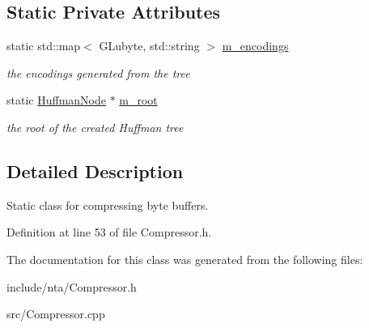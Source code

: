 \subsection*{Static Private Attributes}
\begin{DoxyCompactItemize}
\item 
\mbox{\label{classnta_1_1Compressor_a85e378612ff069d0bc915c87fae74e7d}} 
static std\+::map$<$ G\+Lubyte, std\+::string $>$ \hyperlink{classnta_1_1Compressor_a85e378612ff069d0bc915c87fae74e7d}{m\+\_\+encodings}
\begin{DoxyCompactList}\small\item\em the encodings generated from the tree \end{DoxyCompactList}\item 
\mbox{\label{classnta_1_1Compressor_a9cec9a631892c8cd4b9c2358c7ac41f4}} 
static \hyperlink{classnta_1_1HuffmanNode}{Huffman\+Node} $\ast$ \hyperlink{classnta_1_1Compressor_a9cec9a631892c8cd4b9c2358c7ac41f4}{m\+\_\+root}
\begin{DoxyCompactList}\small\item\em the root of the created Huffman tree \end{DoxyCompactList}\end{DoxyCompactItemize}


\subsection{Detailed Description}
Static class for compressing byte buffers. 

Definition at line 53 of file Compressor.\+h.



The documentation for this class was generated from the following files\+:\begin{DoxyCompactItemize}
\item 
include/nta/Compressor.\+h\item 
src/Compressor.\+cpp\end{DoxyCompactItemize}
